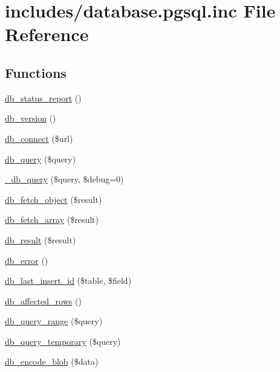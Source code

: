 \hypertarget{database_8pgsql_8inc}{
\section{includes/database.pgsql.inc File Reference}
\label{database_8pgsql_8inc}
}
\subsection*{Functions}
\begin{Indent}{\bf }\par
\begin{CompactItemize}
\item 
\hyperlink{group__database_g0f08b7a80942b33cdc67eebc95e0ee6b}{db\_\-status\_\-report} ()
\item 
\hyperlink{group__database_g6736a6897048ff0167a0bbe5e374fc13}{db\_\-version} ()
\item 
\hyperlink{group__database_gbc9960ee403664deae1c219015dc5ff2}{db\_\-connect} (\$url)
\item 
\hyperlink{group__database_g9e096321b86945d128746ac7bedce8f3}{db\_\-query} (\$query)
\item 
\hyperlink{group__database_gf0a663e6a6aaf095f78a77c871b8028b}{\_\-db\_\-query} (\$query, \$debug=0)
\item 
\hyperlink{group__database_g5faaeba7105d28828db453b4fd3c75d4}{db\_\-fetch\_\-object} (\$result)
\item 
\hyperlink{group__database_g2bd5f98fec7f21ee2c37f6b83785dcb9}{db\_\-fetch\_\-array} (\$result)
\item 
\hyperlink{group__database_g953354ea01b236440b187210dc18aad9}{db\_\-result} (\$result)
\item 
\hyperlink{group__database_g5acae04a62f1baa2e83d189e72071bfe}{db\_\-error} ()
\item 
\hyperlink{group__database_g1d29b142caeee2f0f2217be16857b9ae}{db\_\-last\_\-insert\_\-id} (\$table, \$field)
\item 
\hyperlink{group__database_ge3bc677fbeebd688068ce3b413ac2944}{db\_\-affected\_\-rows} ()
\item 
\hyperlink{group__database_g893cbcab2ecf321005eae4e278adc22b}{db\_\-query\_\-range} (\$query)
\item 
\hyperlink{group__database_gbce8dcddcded20016a1925824cd09efa}{db\_\-query\_\-temporary} (\$query)
\item 
\hyperlink{group__database_g464ab7b26ecfdddc68f3564ca609ac3f}{db\_\-encode\_\-blob} (\$data)

\end{CompactItemize}
\end{Indent}

